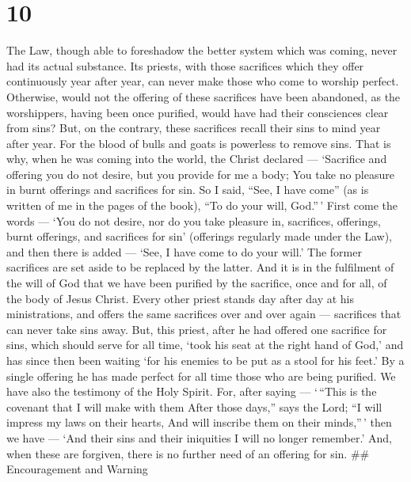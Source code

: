 \hypertarget{section-9}{%
\section{10}\label{section-9}}

 The Law, though able to foreshadow the better system which
was coming, never had its actual substance. Its priests, with those
sacrifices which they offer continuously year after year, can never make
those who come to worship perfect.  Otherwise, would not the
offering of these sacrifices have been abandoned, as the worshippers,
having been once purified, would have had their consciences clear from
sins?  But, on the contrary, these sacrifices recall their
sins to mind year after year.  For the blood of bulls and
goats is powerless to remove sins.  That is why, when he was
coming into the world, the Christ declared --- `Sacrifice and offering
you do not desire, but you provide for me a body;  You take
no pleasure in burnt offerings and sacrifices for sin.  So I
said, ``See, I have come'' (as is written of me in the pages of the
book), ``To do your will, God.''\,'  First come the words
--- `You do not desire, nor do you take pleasure in, sacrifices,
offerings, burnt offerings, and sacrifices for sin' (offerings regularly
made under the Law),  and then there is added --- `See, I
have come to do your will.' The former sacrifices are set aside to be
replaced by the latter.  And it is in the fulfilment of the
will of God that we have been purified by the sacrifice, once and for
all, of the body of Jesus Christ.  Every other priest
stands day after day at his ministrations, and offers the same
sacrifices over and over again --- sacrifices that can never take sins
away.  But, this priest, after he had offered one sacrifice
for sins, which should serve for all time, `took his seat at the right
hand of God,'  and has since then been waiting `for his
enemies to be put as a stool for his feet.'  By a single
offering he has made perfect for all time those who are being purified.
 We have also the testimony of the Holy Spirit. For, after
saying ---  `\,``This is the covenant that I will make with
them After those days,'' says the Lord; ``I will impress my laws on
their hearts, And will inscribe them on their minds,''\,' 
then we have --- `And their sins and their iniquities I will no longer
remember.'  And, when these are forgiven, there is no
further need of an offering for sin. \#\# Encouragement and Warning

